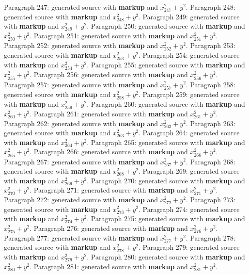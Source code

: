 \documentclass{article}
\begin{document}
Paragraph 247: generated source with \textbf{markup} and $x_{247}^2 + y^2$.
Paragraph 248: generated source with \textbf{markup} and $x_{248}^2 + y^2$.
Paragraph 249: generated source with \textbf{markup} and $x_{249}^2 + y^2$.
Paragraph 250: generated source with \textbf{markup} and $x_{250}^2 + y^2$.
Paragraph 251: generated source with \textbf{markup} and $x_{251}^2 + y^2$.
Paragraph 252: generated source with \textbf{markup} and $x_{252}^2 + y^2$.
Paragraph 253: generated source with \textbf{markup} and $x_{253}^2 + y^2$.
Paragraph 254: generated source with \textbf{markup} and $x_{254}^2 + y^2$.
Paragraph 255: generated source with \textbf{markup} and $x_{255}^2 + y^2$.
Paragraph 256: generated source with \textbf{markup} and $x_{256}^2 + y^2$.
Paragraph 257: generated source with \textbf{markup} and $x_{257}^2 + y^2$.
Paragraph 258: generated source with \textbf{markup} and $x_{258}^2 + y^2$.
Paragraph 259: generated source with \textbf{markup} and $x_{259}^2 + y^2$.
Paragraph 260: generated source with \textbf{markup} and $x_{260}^2 + y^2$.
Paragraph 261: generated source with \textbf{markup} and $x_{261}^2 + y^2$.
Paragraph 262: generated source with \textbf{markup} and $x_{262}^2 + y^2$.
Paragraph 263: generated source with \textbf{markup} and $x_{263}^2 + y^2$.
Paragraph 264: generated source with \textbf{markup} and $x_{264}^2 + y^2$.
Paragraph 265: generated source with \textbf{markup} and $x_{265}^2 + y^2$.
Paragraph 266: generated source with \textbf{markup} and $x_{266}^2 + y^2$.
Paragraph 267: generated source with \textbf{markup} and $x_{267}^2 + y^2$.
Paragraph 268: generated source with \textbf{markup} and $x_{268}^2 + y^2$.
Paragraph 269: generated source with \textbf{markup} and $x_{269}^2 + y^2$.
Paragraph 270: generated source with \textbf{markup} and $x_{270}^2 + y^2$.
Paragraph 271: generated source with \textbf{markup} and $x_{271}^2 + y^2$.
Paragraph 272: generated source with \textbf{markup} and $x_{272}^2 + y^2$.
Paragraph 273: generated source with \textbf{markup} and $x_{273}^2 + y^2$.
Paragraph 274: generated source with \textbf{markup} and $x_{274}^2 + y^2$.
Paragraph 275: generated source with \textbf{markup} and $x_{275}^2 + y^2$.
Paragraph 276: generated source with \textbf{markup} and $x_{276}^2 + y^2$.
Paragraph 277: generated source with \textbf{markup} and $x_{277}^2 + y^2$.
Paragraph 278: generated source with \textbf{markup} and $x_{278}^2 + y^2$.
Paragraph 279: generated source with \textbf{markup} and $x_{279}^2 + y^2$.
Paragraph 280: generated source with \textbf{markup} and $x_{280}^2 + y^2$.
Paragraph 281: generated source with \textbf{markup} and $x_{281}^2 + y^2$.
\end{document}
